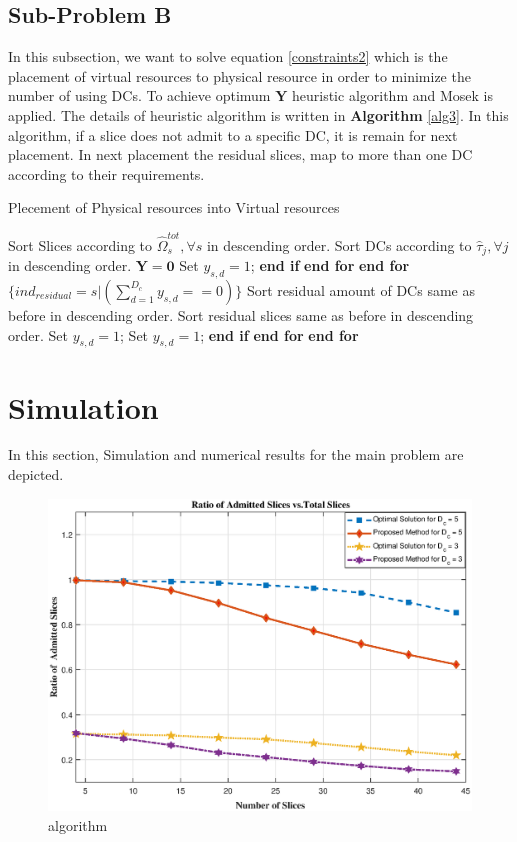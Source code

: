 \documentclass[conference]{IEEEtran}
\begin{document}
\subsection{Sub-Problem B}
In this subsection, we want to solve equation \eqref{constraints2} which is the placement of virtual resources to physical resource in order to minimize the number of using DCs. 
To achieve optimum $\boldsymbol{Y}$ heuristic algorithm and Mosek is applied. The details of heuristic algorithm is written in \textbf{Algorithm} \eqref{alg3}. In this algorithm, if a slice does not admit to a specific DC, it is remain for next placement. In next placement the residual slices, map to more than one DC according to their requirements.
\begin{algorithm}
\caption{Plecement of Physical resources into Virtual resources}\label{alg3}
\begin{algorithmic}[1]
\State Sort Slices according to $\hat{\Omega}_{s}^{tot} , \forall s$ in descending order.
\State Sort DCs according to $\hat{\tau}_j , \forall j$ in descending order. 
\State $\boldsymbol{Y} = \boldsymbol{0}$
\State Set $y_{s,d} = 1$;
\EndIf 
\State \textbf{end if}
\EndFor 
\State \textbf{end for}
\EndFor 
\State \textbf{end for}
\State  $\{ind_{residual} = s|({\sum_{d=1}^{D_c}y_{s,d}==0})\}$
\State Sort residual amount of DCs same as before in descending order.
\State Sort residual slices same as before in descending order.
\State Set $y_{s,d} = 1$;
\State Set $y_{s,d} = 1$;
\EndIf 
\State \textbf{end if}
\EndFor 
\State \textbf{end for}
\EndFor 
\State \textbf{end for}
\end{algorithmic}
\end{algorithm}
\section{Simulation}
In this section, Simulation and numerical results for the main problem are depicted.
\begin{figure}[H]
  \centering
    \includegraphics[width=\linewidth]{fig3}
  \caption{algorithm}
  \label{fig:c11}
\end{figure} 


\end{document}
